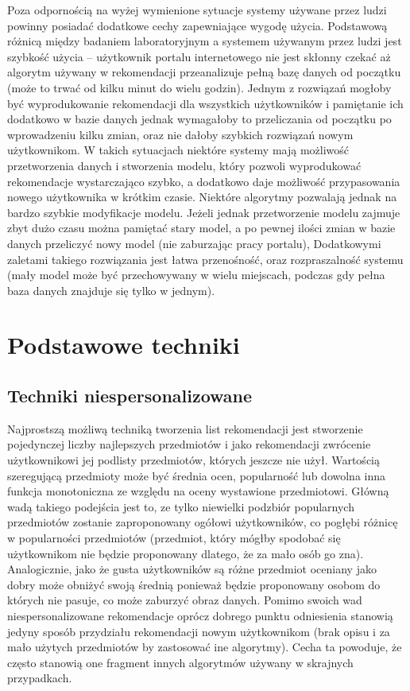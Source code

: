 \documentclass{pracamgr}
\begin{document}
   Poza odpornością na wyżej wymienione sytuacje systemy używane przez ludzi powinny posiadać dodatkowe cechy zapewniające wygodę użycia.
   Podstawową różnicą między badaniem laboratoryjnym a systemem używanym przez ludzi jest szybkość użycia --
   użytkownik portalu internetowego nie jest skłonny czekać aż algorytm używany w rekomendacji przeanalizuje pełną bazę danych od początku
   (może to trwać od kilku minut do wielu godzin).
   Jednym z rozwiązań mogłoby być wyprodukowanie rekomendacji dla wszystkich użytkowników i pamiętanie ich dodatkowo w bazie danych
   jednak wymagałoby to przeliczania od początku po wprowadzeniu kilku zmian, oraz nie dałoby szybkich rozwiązań nowym użytkownikom.
   W takich sytuacjach niektóre systemy mają możliwość przetworzenia danych i stworzenia modelu,
   który pozwoli wyprodukować rekomendacje wystarczająco szybko, a dodatkowo daje możliwość przypasowania nowego użytkownika w krótkim czasie.
   Niektóre algorytmy pozwalają jednak na bardzo szybkie modyfikacje modelu.
   Jeżeli jednak przetworzenie modelu zajmuje zbyt dużo czasu można pamiętać stary model,
   a po pewnej ilości zmian w bazie danych przeliczyć nowy model (nie zaburzając pracy portalu),
   Dodatkowymi zaletami takiego rozwiązania jest łatwa przenośność, oraz rozpraszalność systemu (mały model może być przechowywany w wielu miejscach,
   podczas gdy pełna baza danych znajduje się tylko w jednym).
   


 \chapter{Podstawowe techniki}
  \section{Techniki niespersonalizowane}
   Najprostszą możliwą techniką tworzenia list rekomendacji jest stworzenie pojedynczej liczby najlepszych przedmiotów
   i jako rekomendacji zwrócenie użytkownikowi jej podlisty przedmiotów, których jeszcze nie użył.
   Wartością szeregującą przedmioty może być średnia ocen, popularność lub dowolna inna funkcja monotoniczna ze względu na oceny wystawione przedmiotowi.
   Główną wadą takiego podejścia jest to, ze tylko niewielki podzbiór popularnych przedmiotów zostanie zaproponowany ogółowi użytkowników,
   co pogłębi różnicę w popularności przedmiotów (przedmiot, który mógłby spodobać się użytkownikom nie będzie proponowany dlatego, że za mało osób go zna).
   Analogicznie, jako że gusta użytkowników są różne przedmiot oceniany jako dobry może obniżyć swoją średnią ponieważ będzie proponowany osobom do których nie pasuje,
   co może zaburzyć obraz danych.\newline
   Pomimo swoich wad niespersonalizowane rekomendacje oprócz dobrego punktu odniesienia stanowią jedyny sposób przydziału rekomendacji nowym użytkownikom
   (brak opisu i za mało użytych przedmiotów by zastosować ine algorytmy).
   Cecha ta powoduje, że często stanowią one fragment innych algorytmów używany w skrajnych przypadkach. 
\end{document}
